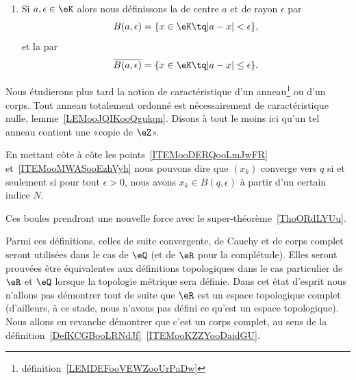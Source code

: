\begin{definition}
\begin{enumerate}
        \item       \label{ITEMooMWASooEzhVyh}
            Si \( a,\epsilon\in \eK\) alors nous définissons la  de centre \( a\) et de rayon \( \epsilon\) par
            \begin{equation}
                B(a,\epsilon)=\{ x\in \eK\tq | a-x |<\epsilon \},
            \end{equation}
            et la  par
            \begin{equation}
                \overline{ B(a,\epsilon) }=\{ x\in \eK\tq | a-x |\leq \epsilon \}.
            \end{equation}

    \end{enumerate}
\end{definition}

\begin{remark}
    Nous étudierons plus tard la notion de caractéristique d'un anneau\footnote{définition~\ref{LEMDEFooVEWZooUrPaDw}} ou d'un corps. Tout anneau totalement ordonné est nécessairement de caractéristique nulle, lemme~\ref{LEMooJQIKooQgukqn}. Disons à tout le moins ici qu'un tel anneau contient une «copie de $\eZ$».
\end{remark}

\begin{remark}
    En mettant côte à côte les points~\ref{ITEMooDERQooLmJwFR} et~\ref{ITEMooMWASooEzhVyh} nous pouvons dire que \( (x_k)\) converge vers \( q\) si et seulement si pour tout \( \epsilon>0\), nous avons \( x_k\in B(q,\epsilon)\) à partir d'un certain indice \( N\).

    Ces boules prendront une nouvelle force avec le super-théorème~\ref{ThoORdLYUu}.
\end{remark}

Parmi ces définitions, celles de suite convergente, de Cauchy et de corps complet seront utilisées dans le cas de \( \eQ\) (et de \( \eR\) pour la complétude). Elles seront prouvées être équivalentes aux définitions topologiques dans le cas particulier de \( \eR\) et \( \eQ\) lorsque la topologie métrique sera définie. Dans cet état d'esprit nous n'allons pas démontrer tout de suite que \( \eR\) est un espace topologique complet (d'ailleurs, à ce stade, nous n'avons pas défini ce qu'est un espace topologique). Nous allons en revanche démontrer que c'est un corps complet, au sens de la définition~\ref{DefKCGBooLRNdJf}~\ref{ITEMooKZZYooDaidGU}.

